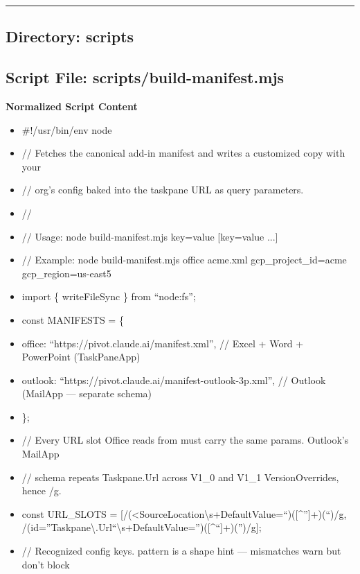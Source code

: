 \documentclass[11pt]{article}
\begin{document}
\vspace{0.8em}\hrule\vspace{0.8em}

\subsection{Directory: scripts}

\subsection{Script File: scripts/build-manifest.mjs}\label{file:scripts-build-manifest-mjs}

\textbf{Normalized Script Content}
\begin{itemize}[leftmargin=*,itemsep=2pt,topsep=2pt]
\item {} \#!/usr/bin/env node
\item {} // Fetches the canonical add-in manifest and writes a customized copy with your
\item {} // org's config baked into the taskpane URL as query parameters.
\item {} //
\item {} // Usage: node build-manifest.mjs key=value [key=value ...]
\item {} // Example: node build-manifest.mjs office acme.xml gcp\_\allowbreak{}project\_\allowbreak{}id=acme gcp\_\allowbreak{}region=us-east5
\item {} import \{ writeFileSync \} from ``node:fs'';
\item {} const MANIFESTS = \{
\item {} office: ``https://pivot.claude.ai/manifest.xml'', // Excel + Word + PowerPoint (TaskPaneApp)
\item {} outlook: ``https://pivot.claude.ai/manifest-outlook-3p.xml'', // Outlook (MailApp — separate schema)
\item {} \};
\item {} // Every URL slot Office reads from must carry the same params. Outlook's MailApp
\item {} // schema repeats Taskpane.Url across V1\_\allowbreak{}0 and V1\_\allowbreak{}1 VersionOverrides, hence /g.
\item {} const URL\_\allowbreak{}SLOTS = [/(<SourceLocation\textbackslash{}s+DefaultValue=``)([\textasciicircum{}'']+)(``)/g, /(id=''Taskpane\textbackslash{}.Url``\textbackslash{}s+DefaultValue='')([\textasciicircum{}``]+)('')/g];
\item {} // Recognized config keys. pattern is a shape hint — mismatches warn but don't block

\end{itemize}
\end{document}
